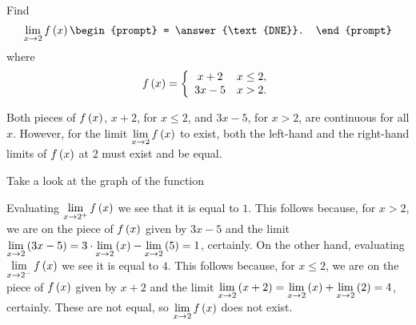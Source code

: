 \documentclass{ximera}
\author{Gregory Hartman \and Matthew Carr}
\begin{document}
\begin{exercise}



  Find 
  \[
  \lim_{x\to 2} f\p{x}
  \begin{prompt}
  = \answer{\text{DNE}}.
  \end{prompt}
  \]
  where
  \[
  f\left(x\right) = \left\{\begin{array}{cl} x+2 & x\leq 2, \\ 3x-5 & x>2. \end{array}\right.
  \]
    \begin{hint}
     Both pieces of $f\left(x\right)$, $x+2$, for $x\le2$, and $3x-5$, for $x>2$, are continuous for all $x$. However, for the limit $\lim_{x\to2}f\p{x}$ to exist, both the left-hand and the right-hand limits of $f\left(x\right)$ at $2$ must exist and be equal.
    \end{hint}
     \begin{hint}
    	Take a look at the graph of the function
    \begin{center}
      \end{center} 
    \end{hint}
    \begin{hint}
     Evaluating $\lim_{x\to2^{+}}f\p{x}$ we see that it is equal to $1$. This follows because, for $x>2$, we are on the piece of $f\left(x\right)$ given by $3x-5$ and the limit $\lim_{x\to2}\p{3x-5}=3\cdot\lim_{x\to 2}\p{x}-\lim_{x\to2}\p{5}=1$, certainly. On the other hand, evaluating $\lim_{x\to2^{-}}f\p{x}$ we see it is equal to $4$. This follows because, for $x\le2$, we are on the piece of $f\left(x\right)$ given by $x+2$ and the limit $\lim_{x\to2}\p{x+2}=\lim_{x\to2}\p{x}+\lim_{x\to2}\p{2}=4$, certainly. These are not equal, so $\lim_{x\to 2}f\p{x}$ does not exist.
    \end{hint} 
\end{exercise}
\end{document}
